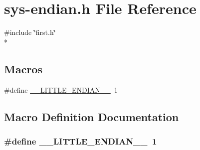\hypertarget{sys-endian_8h}{\section{sys-\/endian.h File Reference}
\label{sys-endian_8h}
}
{\ttfamily \#include \char`\"{}first.\-h\char`\"{}}\\*
\subsection*{Macros}
\begin{DoxyCompactItemize}
\item 
\#define \hyperlink{sys-endian_8h_a25c46c075890625fec5c2f92a369ab21}{\-\_\-\-\_\-\-L\-I\-T\-T\-L\-E\-\_\-\-E\-N\-D\-I\-A\-N\-\_\-\-\_\-}~1
\end{DoxyCompactItemize}


\subsection{Macro Definition Documentation}
\hypertarget{sys-endian_8h_a25c46c075890625fec5c2f92a369ab21}{
\subsubsection[{\-\_\-\-\_\-\-L\-I\-T\-T\-L\-E\-\_\-\-E\-N\-D\-I\-A\-N\-\_\-\-\_\-}]{\setlength{\rightskip}{0pt plus 5cm}\#define \-\_\-\-\_\-\-L\-I\-T\-T\-L\-E\-\_\-\-E\-N\-D\-I\-A\-N\-\_\-\-\_\-~1}}\label{sys-endian_8h_a25c46c075890625fec5c2f92a369ab21}
